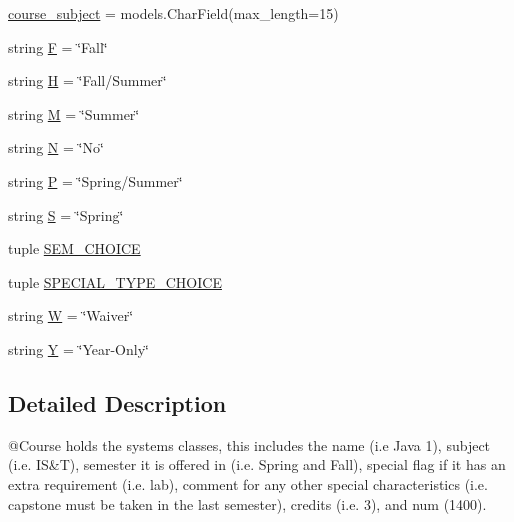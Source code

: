 \begin{DoxyCompactItemize}
\item 
\mbox{\hyperlink{classmavAgenda_1_1landing_1_1models_1_1Course_a00f85c8e8f12e5f0bd4a1cfd3acdc1b2}{course\+\_\+subject}} = models.\+Char\+Field(max\+\_\+length=15)
\item 
string \mbox{\hyperlink{classmavAgenda_1_1landing_1_1models_1_1Course_a6e8ba2964bcec7c3717ba6fac5150282}{F}} = \char`\"{}Fall\char`\"{}
\item 
string \mbox{\hyperlink{classmavAgenda_1_1landing_1_1models_1_1Course_aa13044ed40c5356c6de9f4d484e30f41}{H}} = \char`\"{}Fall/Summer\char`\"{}
\item 
string \mbox{\hyperlink{classmavAgenda_1_1landing_1_1models_1_1Course_a15987a8dfaa0f5fa4bc0e6a68c82eb13}{M}} = \char`\"{}Summer\char`\"{}
\item 
string \mbox{\hyperlink{classmavAgenda_1_1landing_1_1models_1_1Course_a4c7e3d50d00ac9a1edf1d19407259e58}{N}} = \char`\"{}No\char`\"{}
\item 
string \mbox{\hyperlink{classmavAgenda_1_1landing_1_1models_1_1Course_a8065cf384f5fed6bcb340179d2e8c2f6}{P}} = \char`\"{}Spring/Summer\char`\"{}
\item 
string \mbox{\hyperlink{classmavAgenda_1_1landing_1_1models_1_1Course_ab149d36a98d8a629ce2a6e393abaf122}{S}} = \char`\"{}Spring\char`\"{}
\item 
tuple \mbox{\hyperlink{classmavAgenda_1_1landing_1_1models_1_1Course_ae05d55465b858136d199cf3fb56c1cd9}{S\+E\+M\+\_\+\+C\+H\+O\+I\+CE}}
\item 
tuple \mbox{\hyperlink{classmavAgenda_1_1landing_1_1models_1_1Course_a810babb1a1eb7ec206989017427fd2af}{S\+P\+E\+C\+I\+A\+L\+\_\+\+T\+Y\+P\+E\+\_\+\+C\+H\+O\+I\+CE}}
\item 
string \mbox{\hyperlink{classmavAgenda_1_1landing_1_1models_1_1Course_a81fad615d231e798df111c953407c255}{W}} = \char`\"{}Waiver\char`\"{}
\item 
string \mbox{\hyperlink{classmavAgenda_1_1landing_1_1models_1_1Course_a1bf10eebe4267736e6680c1ad015ee30}{Y}} = \char`\"{}Year-\/Only\char`\"{}
\end{DoxyCompactItemize}


\subsection{Detailed Description}
\begin{DoxyVerb}@Course holds the systems classes, this includes the
        name (i.e Java 1), subject (i.e. IS&T), semester it is offered in (i.e. Spring and Fall),
        special flag if it has an extra requirement (i.e. lab), comment for any other special
        characteristics (i.e. capstone must be taken in the last semester),
        credits (i.e. 3), and num (1400).
\end{DoxyVerb}
 

